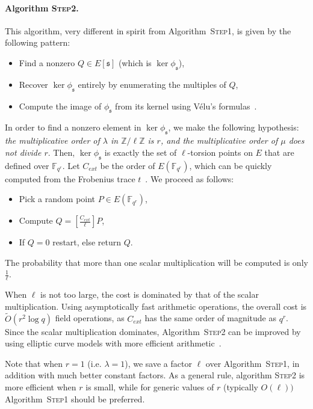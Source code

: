 \documentclass{article}
\newcommand{\F}{\mathbb{F}}
\newcommand{\Z}{\mathbb{Z}}
\newcommand{\softO}{\tilde{O}}
\newcommand{\algstyle}[1]{\textsc{#1}}
\renewcommand{\frak}{\mathfrak}
\theoremstyle{definition}
\begin{document}
\paragraph{Algorithm \algstyle{Step2}.} This algorithm, very different
in spirit from Algorithm~\algstyle{Step1}, is given by the following
pattern:
\begin{itemize}
\item Find a nonzero $Q\in E[\frak s]$ (which is $\ker \phi_{\frak s}$),
\item Recover $\ker \phi_{\frak s}$ entirely by enumerating the multiples of $Q$,
\item Compute the image of $\phi_{\frak s}$ from its kernel using
Vélu's formulas~\cite{todo:velu}.
\end{itemize}
In order to find a nonzero element in $\ker\phi_{\frak s}$, we make the
following hypothesis: \emph{the multiplicative order of $\lambda$ in
$\Z/\ell\Z$ is $r$, and the multiplicative order of $\mu$ does not
divide $r$}. Then, $\ker\phi_{\frak s}$ is exactly the set of $\ell$-torsion
points on $E$ that are defined over $\F_{q^r}$. Let $C_{ext}$ be the
order of $E(\F_{q^r})$, which can be quickly computed from the
Frobenius trace $t$~\cite{todo:hasseext}.
We proceed as follows:
\begin{itemize}
\item Pick a random point $P\in E(\F_{q^r})$,
\item Compute $Q = \left[\frac{C_{ext}}{\ell}\right]P$,
\item If $Q = 0$ restart, else return $Q$.
\end{itemize}
The probability that more than one scalar multiplication will be computed
is only $\frac{1}{\ell}$.

When $\ell$ is not too large, the cost is dominated by that of the scalar
multiplication. Using asymptotically fast arithmetic operations,
the overall cost is $\softO(r^2\log q)$ field operations, as $C_{ext}$
has the same order of magnitude as $q^r$. Since the scalar
multiplication dominates, Algorithm~\algstyle{Step2} can be improved
by using elliptic curve models with more efficient arithmetic~\cite{todo:curvearith}.

Note that when $r = 1$
(i.e. $\lambda = 1$), we save a factor $\ell$ over Algorithm~\algstyle{Step1},
in addition with much better constant factors. As a general rule,
algorithm \algstyle{Step2} is more efficient when $r$ is small, while
for generic values of $r$ (typically $O(\ell))$ Algorithm~\algstyle{Step1}
should be preferred.
\end{document}
